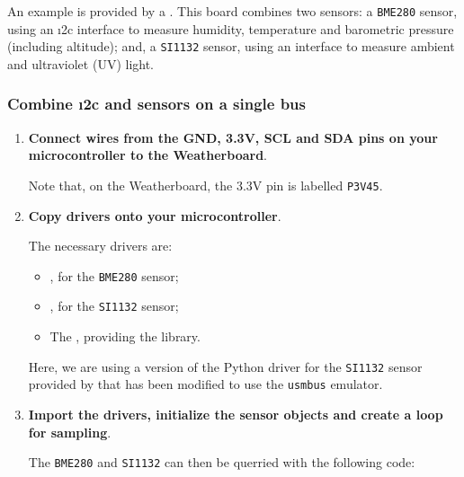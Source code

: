 An example is provided by a .
This board combines two sensors: a \texttt{BME280} sensor, using an \i2c interface to measure humidity, temperature and barometric pressure (including altitude); and, a \texttt{SI1132} sensor, using an \smbus interface to measure ambient and ultraviolet (UV) light.

\subsubsection{\howto Combine \i2c and \smbus sensors on a single bus}
\begin{enumerate}
	\item \textbf{Connect wires from the GND, 3.3V, SCL and SDA pins on your microcontroller to the Weatherboard}.

	Note that, on the Weatherboard, the 3.3V pin is labelled \texttt{P3V45}.

	\item \textbf{Copy drivers onto your microcontroller}.

	The necessary drivers are:
	\begin{itemize}
		\item {}, for the \texttt{BME280} sensor;
		\item {}, for the \texttt{SI1132} sensor;
		\item The , providing the \smbus library.
	\end{itemize}
	Here, we are using a version of the Python driver for the \texttt{SI1132} sensor provided by  that has been modified to use the \texttt{usmbus} \smbus emulator.

	\item \textbf{Import the drivers, initialize the sensor objects and create a loop for sampling}.

	The \texttt{BME280} and \texttt{SI1132} can then be querried with the following code:



\end{enumerate}
